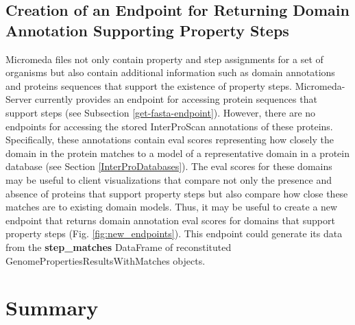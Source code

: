 \subsection{Creation of an Endpoint for Returning Domain Annotation Supporting 
Property Steps} \label{e-value-endpoint}

Micromeda files not only contain property and step assignments for a set of 
organisms but also contain additional information such as domain annotations and 
proteins sequences that support the existence of property steps. 
Micromeda-Server currently provides an endpoint for accessing protein sequences 
that support steps (see Subsection \ref{get-fasta-endpoint}). However, there are 
no endpoints for accessing the stored InterProScan annotations of these 
proteins. Specifically, these annotations contain \gls{eval} scores representing 
how closely the domain in the protein matches to a model of a representative 
domain in a protein database (see Section \ref{InterProDatabases}). The 
\gls{eval} scores for these domains may be useful to client visualizations that 
compare not only the presence and absence of proteins that support property 
steps but also compare how close these matches are to existing domain models. 
Thus, it may be useful to create a new endpoint that returns domain annotation 
\gls{eval} scores for domains that support property steps (Fig. 
\ref{fig:new_endpoints}). This endpoint could generate its data from the 
\textbf{step\_matches} DataFrame of reconstituted 
GenomePropertiesResultsWithMatches objects.

\section{Summary} \label{server-summary}

